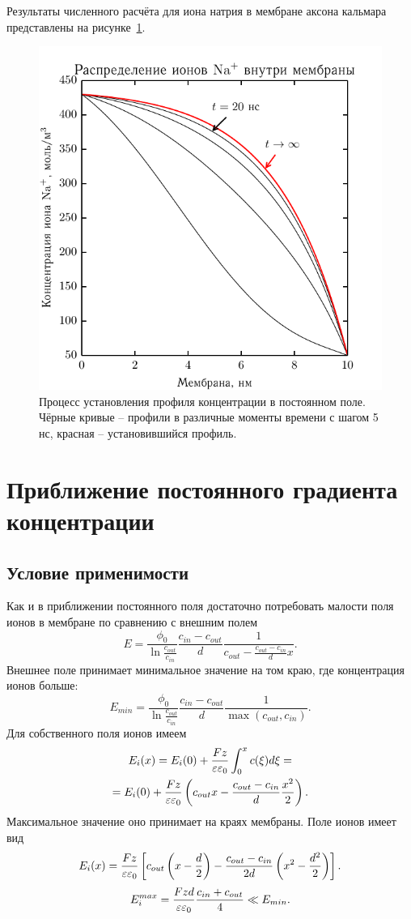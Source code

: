     Результаты численного расчёта для иона натрия в мембране аксона кальмара
    представлены на рисунке~\ref{fig:1}.
    \begin{figure}[H]
    \begin{center}
        \includegraphics[width=.7\textwidth]{plots/linear_field}
    \end{center}
    \caption{Процесс установления профиля концентрации в постоянном поле. Чёрные
    кривые -- профили в различные моменты времени с шагом 5 нс, красная --
    установившийся профиль.}
    \label{fig:1}
    \end{figure}


\section{Приближение постоянного градиента концентрации}
\subsection{Условие применимости}
    Как и в приближении постоянного поля достаточно потребовать малости поля
    ионов в мембране по сравнению с внешним полем
    \[
        E = \frac{\phi_0}{\ln\frac{c_{out}}{c_{in}}}
            \frac{c_{in} - c_{out}}{d}
            \frac{1}{c_{out} - \frac{c_{out} - c_{in}}{d} x}.
    \]
    Внешнее поле принимает минимальное значение на том краю, где концентрация
    ионов больше:
    \[
        E_{min} = \frac{\phi_0}{\ln\frac{c_{out}}{c_{in}}}
            \frac{c_{in} - c_{out}}{d}\frac{1}{\max(c_{out}, c_{in})}.
    \]
    Для собственного поля ионов имеем
    \begin{gather*}
        E_i(x) = E_i(0) + \frac{Fz}{\varepsilon\varepsilon_0}\int_0^x c(\xi)d\xi = \\
        = E_i(0) + \frac{Fz}{\varepsilon\varepsilon_0}\left(
        c_{out} x - \frac{c_{out} - c_{in}}{d}\frac{x^2}{2}\right).
    \end{gather*}
    Максимальное значение оно принимает на краях мембраны. Поле ионов имеет вид
    \[
        E_i(x) = \frac{Fz}{\varepsilon\varepsilon_0}\left[
        c_{out} \left(x-\frac{d}{2}\right) - \frac{c_{out} - c_{in}}{2d}
        \left(x^2 - \frac{d^2}{2}\right)
        \right].
    \]
    \[
        E_i^{max} = \frac{Fzd}{\varepsilon\varepsilon_0}\frac{c_{in}+c_{out}}{4} \ll E_{min}.
    \]

